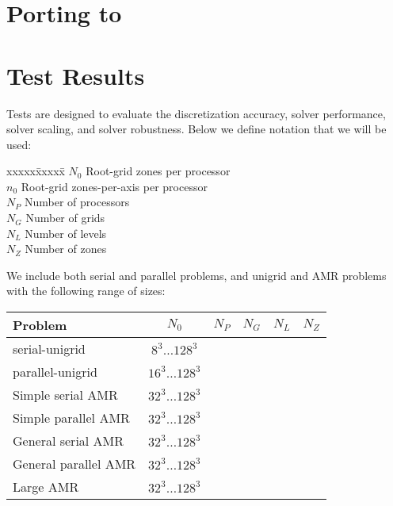 \documentclass[10pt]{article}
\begin{document}
\section{Porting to \enzo}

\section{Test Results} \label{s:results}

Tests are designed to evaluate the discretization accuracy, solver
performance, solver scaling, and solver robustness.  Below we define
notation that we will be used:

\begin{tabbing}
xxxxx\=xxxxx\=\kill
\> $N_0$ \> Root-grid zones per processor \\
\> $n_0$ \> Root-grid zones-per-axis  per processor \\
\> $N_P$ \> Number of processors \\
\> $N_G$ \> Number of grids \\
\> $N_L$ \> Number of levels \\
\> $N_Z$ \> Number of zones
\end{tabbing}

We include both serial and parallel problems, and unigrid and AMR problems with
the following range of sizes:

\begin{tabular}{l|ccccc} \\
Problem & $N_0$ & $N_P$ & $N_G$ & $N_L$ & $N_Z$ \\ \hline
serial-unigrid       & $8^3\ldots 128^3$ & & & \\
parallel-unigrid     & $16^3\ldots 128^3$ & & & \\
Simple serial AMR    & $32^3\ldots 128^3$ & & & \\
Simple parallel AMR  & $32^3\ldots 128^3$ & & & \\
General serial AMR   & $32^3\ldots 128^3$ & & & \\
General parallel AMR & $32^3\ldots 128^3$ & & & \\
Large AMR            & $32^3\ldots 128^3$ & & & \\
\end{tabular}
\end{document}
